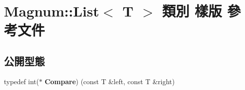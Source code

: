 \hypertarget{class_magnum_1_1_list}{}\section{Magnum\+:\+:List$<$ T $>$ 類別 樣版 參考文件}
\label{class_magnum_1_1_list}
\subsection*{公開型態}
\begin{DoxyCompactItemize}
\item 
typedef int($\ast$ {\bfseries Compare}) (const T \&left, const T \&right)\hypertarget{class_magnum_1_1_list_af60c71baf14eecc9c4b714f8077176c8}{}\label{class_magnum_1_1_list_af60c71baf14eecc9c4b714f8077176c8}

\end{DoxyCompactItemize}
